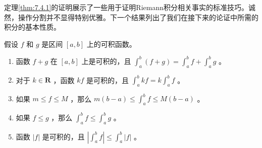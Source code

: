 定理\ref{thm:7.4.1}的证明展示了一些用于证明Riemann积分相关事实的标准技巧。诚然，操作分割并不显得特别优雅。下一个结果列出了我们在接下来的论证中所需的积分的基本性质。


\begin{Thm}\label{thm:7.4.2}
假设 \(f\) 和 \(g\) 是区间 \(\left\lbrack  {a,b}\right\rbrack\) 上的可积函数。
\begin{enumerate}[label = (\roman*)]
\item\label{item:7.4.1} 函数 \(f + g\) 在 \(\left\lbrack  {a,b}\right\rbrack\) 上是可积的，且 \({\int }_{a}^{b}\left( {f + g}\right)  = {\int }_{a}^{b}f + {\int }_{a}^{b}g\) 。
\item\label{item:7.4.2} 对于 \(k \in  \mathbf{R}\) ，函数 \({kf}\) 是可积的，且 \({\int }_{a}^{b}{kf} = k{\int }_{a}^{b}f\) 。
\item\label{item:7.4.3} 如果 \(m \leq  f \leq  M\) ，那么 \(m\left( {b - a}\right)  \leq  {\int }_{a}^{b}f \leq  M\left( {b - a}\right)\) 。
\item\label{item:7.4.4} 如果 \(f \leq  g\) ，那么 \({\int }_{a}^{b}f \leq  {\int }_{a}^{b}g\) 。
\item\label{item:7.4.5} 函数 \(\left| f\right|\) 是可积的，且 \(\left| {{\int }_{a}^{b}f}\right|  \leq  {\int }_{a}^{b}\left| f\right|\) 。
\end{enumerate}
\end{Thm}

